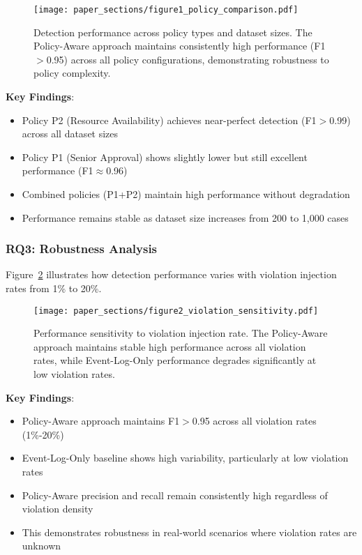 \begin{figure}[htbp]
    \centering
    \texttt{[image: paper\_sections/figure1\_policy\_comparison.pdf]}
    \caption{Detection performance across policy types and dataset sizes. The Policy-Aware approach maintains consistently high performance (F1$>$0.95) across all policy configurations, demonstrating robustness to policy complexity.}
    \label{fig:policy_comparison}
\end{figure}

\textbf{Key Findings}:
\begin{itemize}
    \item Policy P2 (Resource Availability) achieves near-perfect detection (F1$>$0.99) across all dataset sizes
    \item Policy P1 (Senior Approval) shows slightly lower but still excellent performance (F1$\approx$0.96)
    \item Combined policies (P1+P2) maintain high performance without degradation
    \item Performance remains stable as dataset size increases from 200 to 1,000 cases
\end{itemize}

\subsubsection{RQ3: Robustness Analysis}

Figure~\ref{fig:violation_sensitivity} illustrates how detection performance varies with violation injection rates from 1\% to 20\%.

\begin{figure}[htbp]
    \centering
    \texttt{[image: paper\_sections/figure2\_violation\_sensitivity.pdf]}
    \caption{Performance sensitivity to violation injection rate. The Policy-Aware approach maintains stable high performance across all violation rates, while Event-Log-Only performance degrades significantly at low violation rates.}
    \label{fig:violation_sensitivity}
\end{figure}

\textbf{Key Findings}:
\begin{itemize}
    \item Policy-Aware approach maintains F1$>$0.95 across all violation rates (1\%-20\%)
    \item Event-Log-Only baseline shows high variability, particularly at low violation rates
    \item Policy-Aware precision and recall remain consistently high regardless of violation density
    \item This demonstrates robustness in real-world scenarios where violation rates are unknown
\end{itemize}

